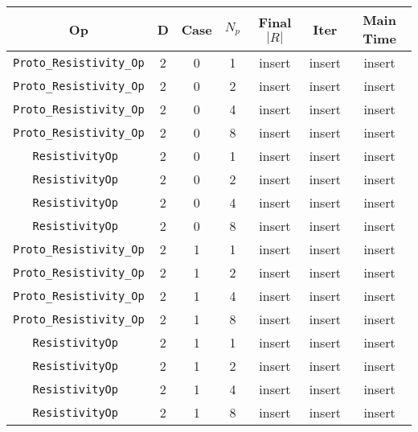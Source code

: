 \documentclass{article}
\begin{document}
\begin{small}
\begin{table}
\begin{center}
\begin{tabular}{|c|c|c|c|c|c||c|} \hline
 Op & D & Case & $N_p$ & Final $|R|$  &  Iter & Main Time \\
\hline
 {\tt Proto\_Resistivity\_Op} & 2 & 0 &   1    &  insert  &  insert    & insert   \\
 {\tt Proto\_Resistivity\_Op} & 2 & 0 &   2    &  insert  &  insert    & insert   \\
 {\tt Proto\_Resistivity\_Op} & 2 & 0 &   4    &  insert  &  insert    & insert   \\
 {\tt Proto\_Resistivity\_Op} & 2 & 0 &   8    &  insert  &  insert    & insert   \\
\hline                                                                                
 {\tt ResistivityOp }         & 2 & 0   & 1    &  insert  &  insert    & insert    \\
 {\tt ResistivityOp }         & 2 & 0   & 2    &  insert  &  insert    & insert    \\
 {\tt ResistivityOp }         & 2 & 0   & 4    &  insert  &  insert    & insert    \\
 {\tt ResistivityOp }         & 2 & 0   & 8    &  insert  &  insert    & insert    \\
\hline                                                                                
 {\tt Proto\_Resistivity\_Op} & 2 & 1   & 1    &  insert  &  insert    & insert   \\
 {\tt Proto\_Resistivity\_Op} & 2 & 1   & 2    &  insert  &  insert    & insert   \\
 {\tt Proto\_Resistivity\_Op} & 2 & 1   & 4    &  insert  &  insert    & insert   \\
 {\tt Proto\_Resistivity\_Op} & 2 & 1   & 8    &  insert  &  insert    & insert   \\
\hline                                                                                
 {\tt ResistivityOp }         & 2 & 1   & 1    &  insert  &  insert    & insert    \\
 {\tt ResistivityOp }         & 2 & 1   & 2    &  insert  &  insert    & insert    \\
 {\tt ResistivityOp }         & 2 & 1   & 4    &  insert  &  insert    & insert    \\
 {\tt ResistivityOp }         & 2 & 1   & 8    &  insert  &  insert    & insert    \\

\end{tabular}
\end{center}
\end{table}
\end{small}
\end{document}
